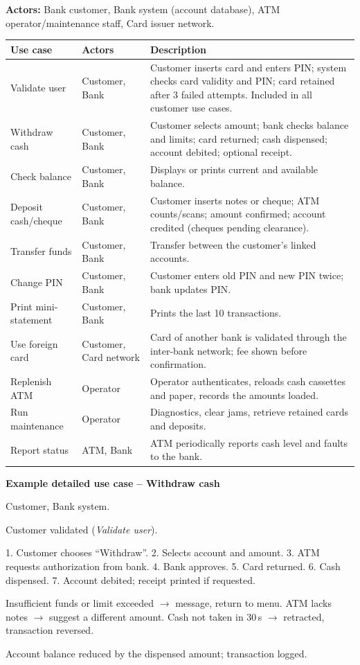 \documentclass[11pt,a4paper]{article}
\begin{document}
\noindent\textbf{Actors:} Bank customer, Bank system (account database), ATM operator/maintenance staff, Card issuer network.

\begin{longtable}{@{}p{3.2cm}p{2.8cm}p{9.2cm}@{}}
\toprule
\textbf{Use case} & \textbf{Actors} & \textbf{Description} \\ \midrule\endhead
Validate user & Customer, Bank & Customer inserts card and enters PIN; system checks card validity and PIN; card retained after 3 failed attempts. Included in all customer use cases. \\
Withdraw cash & Customer, Bank & Customer selects amount; bank checks balance and limits; card returned; cash dispensed; account debited; optional receipt. \\
Check balance & Customer, Bank & Displays or prints current and available balance. \\
Deposit cash/cheque & Customer, Bank & Customer inserts notes or cheque; ATM counts/scans; amount confirmed; account credited (cheques pending clearance). \\
Transfer funds & Customer, Bank & Transfer between the customer's linked accounts. \\
Change PIN & Customer, Bank & Customer enters old PIN and new PIN twice; bank updates PIN. \\
Print mini-statement & Customer, Bank & Prints the last 10 transactions. \\
Use foreign card & Customer, Card network & Card of another bank is validated through the inter-bank network; fee shown before confirmation. \\
Replenish ATM & Operator & Operator authenticates, reloads cash cassettes and paper, records the amounts loaded. \\
Run maintenance & Operator & Diagnostics, clear jams, retrieve retained cards and deposits. \\
Report status & ATM, Bank & ATM periodically reports cash level and faults to the bank. \\
\bottomrule
\end{longtable}

\noindent\textbf{Example detailed use case -- Withdraw cash}
\begin{description}[leftmargin=2.6cm,style=nextline]
  \item[Actors] Customer, Bank system.
  \item[Pre-condition] Customer validated (\emph{Validate user}).
  \item[Normal flow] 1. Customer chooses ``Withdraw''. 2. Selects account and amount. 3. ATM requests authorization from bank. 4. Bank approves. 5. Card returned. 6. Cash dispensed. 7. Account debited; receipt printed if requested.
  \item[Alternatives] Insufficient funds or limit exceeded $\rightarrow$ message, return to menu. ATM lacks notes $\rightarrow$ suggest a different amount. Cash not taken in 30\,s $\rightarrow$ retracted, transaction reversed.
  \item[Post-condition] Account balance reduced by the dispensed amount; transaction logged.
\end{description}
\end{document}
